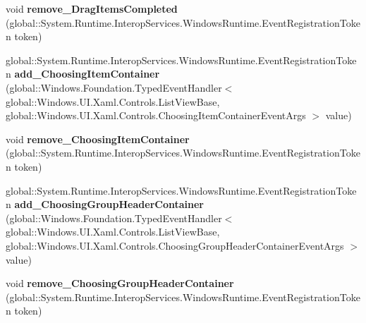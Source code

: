 \begin{DoxyCompactItemize}
\mbox{\label{interface_windows_1_1_u_i_1_1_xaml_1_1_controls_1_1_i_list_view_base4_aa8eed7aa7eefe8deffed7275d822d4ea}} 
void {\bfseries remove\+\_\+\+Drag\+Items\+Completed} (global\+::\+System.\+Runtime.\+Interop\+Services.\+Windows\+Runtime.\+Event\+Registration\+Token token)
\item 
\mbox{\label{interface_windows_1_1_u_i_1_1_xaml_1_1_controls_1_1_i_list_view_base4_a50b9a86d32b7a6ba60f5162b251de868}} 
global\+::\+System.\+Runtime.\+Interop\+Services.\+Windows\+Runtime.\+Event\+Registration\+Token {\bfseries add\+\_\+\+Choosing\+Item\+Container} (global\+::\+Windows.\+Foundation.\+Typed\+Event\+Handler$<$ global\+::\+Windows.\+U\+I.\+Xaml.\+Controls.\+List\+View\+Base, global\+::\+Windows.\+U\+I.\+Xaml.\+Controls.\+Choosing\+Item\+Container\+Event\+Args $>$ value)
\item 
\mbox{\label{interface_windows_1_1_u_i_1_1_xaml_1_1_controls_1_1_i_list_view_base4_ae03f9cc1626fb8ce344e627e8be05680}} 
void {\bfseries remove\+\_\+\+Choosing\+Item\+Container} (global\+::\+System.\+Runtime.\+Interop\+Services.\+Windows\+Runtime.\+Event\+Registration\+Token token)
\item 
\mbox{\label{interface_windows_1_1_u_i_1_1_xaml_1_1_controls_1_1_i_list_view_base4_a676b16cd7663b4ae45652525cdbe9e66}} 
global\+::\+System.\+Runtime.\+Interop\+Services.\+Windows\+Runtime.\+Event\+Registration\+Token {\bfseries add\+\_\+\+Choosing\+Group\+Header\+Container} (global\+::\+Windows.\+Foundation.\+Typed\+Event\+Handler$<$ global\+::\+Windows.\+U\+I.\+Xaml.\+Controls.\+List\+View\+Base, global\+::\+Windows.\+U\+I.\+Xaml.\+Controls.\+Choosing\+Group\+Header\+Container\+Event\+Args $>$ value)
\item 
\mbox{\label{interface_windows_1_1_u_i_1_1_xaml_1_1_controls_1_1_i_list_view_base4_acbca9310b039930aacfa0158b9dd0a63}} 
void {\bfseries remove\+\_\+\+Choosing\+Group\+Header\+Container} (global\+::\+System.\+Runtime.\+Interop\+Services.\+Windows\+Runtime.\+Event\+Registration\+Token token)

\end{DoxyCompactItemize}

